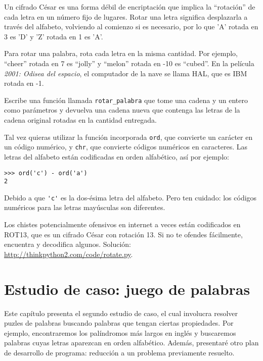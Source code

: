 \documentclass[10pt]{book}
\begin{document}
\begin{exercise}

\label{exrotate}
Un cifrado César es una forma débil de encriptación que implica la ``rotación'' de cada
letra en un número fijo de lugares.  Rotar una letra significa
desplazarla a través del alfabeto, volviendo al comienzo si
es necesario, por lo que 'A' rotada en 3 es 'D' y 'Z' rotada en 1 es 'A'.

Para rotar una palabra, rota cada letra en la misma cantidad.
Por ejemplo, ``cheer'' rotada en 7 es ``jolly'' y ``melon'' rotada
en -10 es ``cubed''.  En la película {\em 2001: Odisea del espacio}, el
computador de la nave se llama HAL, que es IBM rotada en -1.


Escribe una función llamada \verb"rotar_palabra"
que tome una cadena y un entero como parámetros y devuelva
una cadena nueva que contenga las letras de la cadena original
rotadas en la cantidad entregada.

Tal vez quieras utilizar la función incorporada {\tt ord}, que convierte
un carácter en un código numérico, y {\tt chr}, que convierte códigos
numéricos en caracteres.  Las letras del alfabeto están codificadas en orden alfabético,
así por ejemplo:

\begin{verbatim}
>>> ord('c') - ord('a')
2
\end{verbatim}

Debido a que \verb"'c'" es la dos-ésima letra del alfabeto.  Pero ten
cuidado: los códigos numéricos para las letras mayúsculas son diferentes.

Los chistes potencialmente ofensivos en internet a veces están codificados en
ROT13, que es un cifrado César con rotación 13.  Si no te
ofendes fácilmente, encuentra y decodifica algunos.  Solución:
\url{http://thinkpython2.com/code/rotate.py}.

\end{exercise}


\chapter{Estudio de caso: juego de palabras}
\label{wordplay}

Este capítulo presenta el segundo estudio de caso, el cual involucra
resolver puzles de palabras buscando palabras que tengan ciertas
propiedades.  Por ejemplo, encontraremos los palíndromos más largos
en inglés y buscaremos palabras cuyas letras aparezcan en
orden alfabético.  Además, presentaré otro plan de desarrollo de
programa: reducción a un problema previamente resuelto.
\end{document}
